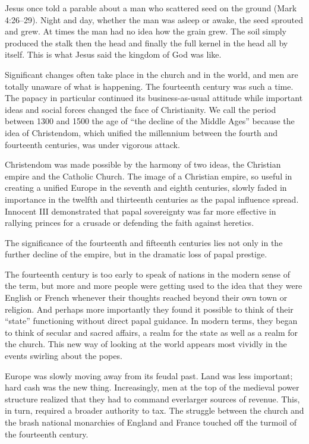Jesus once told a parable about a man who scattered seed on the ground (Mark 4:26–29). Night and
day, whether the man was asleep or awake, the seed sprouted and grew. At times the man had no idea
how the grain grew. The soil simply produced the stalk then the head and finally the full kernel in
the head all by itself. This is what Jesus said the kingdom of God was like.

Significant changes often take place in the church and in the world, and men are totally unaware of
what is happening. The fourteenth century was such a time. The papacy in particular continued its
business-as-usual attitude while important ideas and social forces changed the face of Christianity.
We call the period between 1300 and 1500 the age of “the decline of the Middle Ages” because the
idea of Christendom, which unified the millennium between the fourth and fourteenth centuries, was
under vigorous attack.

Christendom was made possible by the harmony of two ideas, the Christian empire and the Catholic
Church. The image of a Christian empire, so useful in creating a unified Europe in the seventh and
eighth centuries, slowly faded in importance in the twelfth and thirteenth centuries as the papal
influence spread. Innocent III demonstrated that papal sovereignty was far more effective in
rallying princes for a crusade or defending the faith against heretics.

The significance of the fourteenth and fifteenth centuries lies not only in the further decline of
the empire, but in the dramatic loss of papal prestige.

The fourteenth century is too early to speak of nations in the modern sense of the term, but more
and more people were getting used to the idea that they were English or French whenever their
thoughts reached beyond their own town or religion. And perhaps more importantly they found it
possible to think of their “state” functioning without direct papal guidance. In modern terms, they
began to think of secular and sacred affairs, a realm for the state as well as a realm for the
church. This new way of looking at the world appears most vividly in the events swirling about the
popes.

Europe was slowly moving away from its feudal past. Land was less important; hard cash was the new
thing. Increasingly, men at the top of the medieval power structure realized that they had to
command everlarger sources of revenue. This, in turn, required a broader authority to tax. The
struggle between the church and the brash national monarchies of England and France touched off the
turmoil of the fourteenth century.

